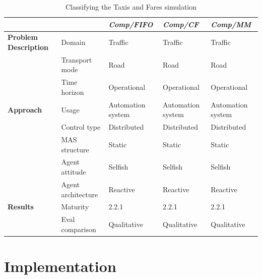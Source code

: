 \documentclass[11pt,letterpaper,onecolumn,twoside,openright,final]{report}
\begin{document}
\begin{table}[htbp]
\begin{tabular}{|l|p{}|p{}|p{}|p{}|}
          &       & \emph{\textbf{Comp/FIFO}} & \emph{\textbf{Comp/CF}} & \emph{\textbf{Comp/MM}} \\
          \hline
          \hline
    \textbf{Problem Description} & Domain & Traffic & Traffic & Traffic \\
          \cline{2-5}
          & Transport mode & Road  & Road  & Road \\
          \cline{2-5}
          & Time horizon & Operational & Operational & Operational \\
          \hline
    \textbf{Approach} & Usage & Automation system & Automation system & Automation system \\
          \cline{2-5}
          & Control type & Distributed & Distributed & Distributed \\
          \cline{2-5}
          & MAS structure & Static & Static & Static \\
          \cline{2-5}
          & Agent attitude & Selfish & Selfish & Selfish \\
          \cline{2-5}
          & Agent architecture & Reactive & Reactive & Reactive \\
          \hline
    \textbf{Results} & Maturity & 2.2.1 & 2.2.1 & 2.2.1 \\
          \cline{2-5}
          & Eval comparison & Qualitative & Qualitative & Qualitative \\
    \hline
    \end{tabular}%
  \caption{Classifying the Taxis and Fares simulation}
  \label{tab:classifying-taxis-and-fares-sim}%
\end{table}%



\chapter{Implementation}
\end{document}
